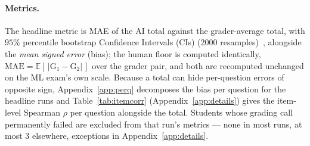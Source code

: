 \paragraph{Metrics.}
The headline metric is MAE of the AI total against the grader-average total, with $95\%$ percentile bootstrap Confidence Intervals (CIs) (\num{2000} resamples)~\citep{10.1214/aos/1176344552,efron1994introductionbootstrap}, alongside the \emph{mean signed error} (bias); the human floor is computed identically, $\text{MAE} = \mathbb{E}[\,|\text{G}_1 - \text{G}_2|\,]$ over the grader pair, and both are recomputed unchanged on the ML exam's own scale. Because a total can hide per-question errors of opposite sign, Appendix~\ref{app:perq} decomposes the bias per question for the headline runs and Table~\ref{tab:itemcorr} (Appendix~\ref{app:details}) gives the item-level Spearman $\rho$ per question alongside the total. Students whose grading call permanently failed are excluded from that run's metrics --- none in most runs, at most $3$ elsewhere, exceptions in Appendix~\ref{app:details}.
